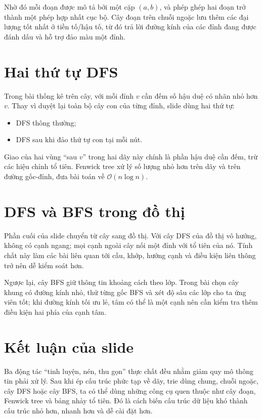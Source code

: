 \documentclass[11pt]{article}
\newcommand{\Oh}{\mathcal{O}}
\begin{document}
Nhờ đó mỗi đoạn được mô tả bởi một cặp \((a,b)\), và phép ghép hai đoạn trở
thành một phép hợp nhất cục bộ. Cây đoạn trên chuỗi ngoặc lưu thêm các đại
lượng tốt nhất ở tiền tố/hậu tố, từ đó trả lời đường kính của các đỉnh đang
được đánh dấu và hỗ trợ đảo màu một đỉnh.

\section{Hai thứ tự DFS}

Trong bài thống kê trên cây, với mỗi đỉnh \(v\) cần đếm số hậu duệ có nhãn nhỏ
hơn \(v\). Thay vì duyệt lại toàn bộ cây con của từng đỉnh, slide dùng hai
thứ tự:
\begin{itemize}
  \item DFS thông thường;
  \item DFS sau khi đảo thứ tự con tại mỗi nút.
\end{itemize}
Giao của hai vùng ``sau \(v\)'' trong hai dãy này chính là phần hậu duệ cần
đếm, trừ các hiệu chỉnh tổ tiên. Fenwick tree xử lý số lượng nhỏ hơn trên dãy
và trên đường gốc-đỉnh, đưa bài toán về \(\Oh(n\log n)\).

\section{DFS và BFS trong đồ thị}

Phần cuối của slide chuyển từ cây sang đồ thị. Với cây DFS của đồ thị vô
hướng, không có cạnh ngang; mọi cạnh ngoài cây nối một đỉnh với tổ tiên của
nó. Tính chất này làm các bài liên quan tới cầu, khớp, hướng cạnh và điều kiện
liên thông trở nên dễ kiểm soát hơn.

Ngược lại, cây BFS giữ thông tin khoảng cách theo lớp. Trong bài chọn cây
khung có đường kính nhỏ, thử từng gốc BFS và xét độ sâu các lớp cho ta ứng
viên tốt; khi đường kính tối ưu lẻ, tâm có thể là một cạnh nên cần kiểm tra
thêm điều kiện hai phía của cạnh tâm.

\section{Kết luận của slide}

Ba động tác ``tinh luyện, nén, thu gọn'' thực chất đều nhằm giảm quy mô thông
tin phải xử lý. Sau khi ép cấu trúc phức tạp về dãy, trie dùng chung, chuỗi
ngoặc, cây DFS hoặc cây BFS, ta có thể dùng những công cụ quen thuộc như cây
đoạn, Fenwick tree và bảng nhảy tổ tiên. Đó là cách biến cấu trúc dữ liệu khó
thành cấu trúc nhỏ hơn, nhanh hơn và dễ cài đặt hơn.
\end{document}
